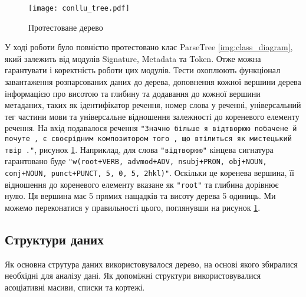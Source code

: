 \begin{figure}[ht]
  \begin{center}
    \texttt{[image: conllu\_tree.pdf]}
  \end{center}
  \caption{Протестоване дерево}
  \label{img:tested_conllu_tree}
\end{figure}

У ході роботи було повністю протестовано клас ParseTree \ref{img:class_diagram}, який залежить
від модулів Signature, Metadata та Token. Отже можна гарантувати і коректність роботи цих
модулів. Тести охоплюють функціонал завантаження розпарсованих даних до дерева, доповнення
кожної вершини дерева інформацією про висотою та глибину та додавання до кожної
вершини метаданих, таких як ідентифікатор речення, номер слова у реченні, універсальний тег
частини мови та універсальне відношення залежності до кореневого елементу речення.
На вхід подавалося речення \texttt{"Значно більше я відтворюю побачене й почуте , є своєрідним
композитором того , що втілиться як мистецький твір ."}, рисунок \ref{img:tested_conllu_tree}.
Наприклад, для слова \texttt{"відтворюю"} кінцева сигнатура гарантовано буде
\texttt{"w(root+VERB, advmod+ADV, nsubj+PRON, obj+NOUN, conj+NOUN, punct+PUNCT, 5, 0, 5, 2hkl)"}.
Оскільки це коренева вершина, її відношення до кореневого елементу вказане як \texttt{"root"}
та глибина дорівнює нулю. Ця вершина має 5 прямих нащадків та висоту дерева 5 одиниць. Ми можемо
переконатися у правильності цього, поглянувши на рисунок \ref{img:tested_conllu_tree}.

\subsection{Структури даних}
Як основна струтура даних використовувалося дерево, на основі якого збиралися необхідні
для аналізу дані. Як допоміжні структури використовувалися асоціативні масиви, списки та
кортежі.

